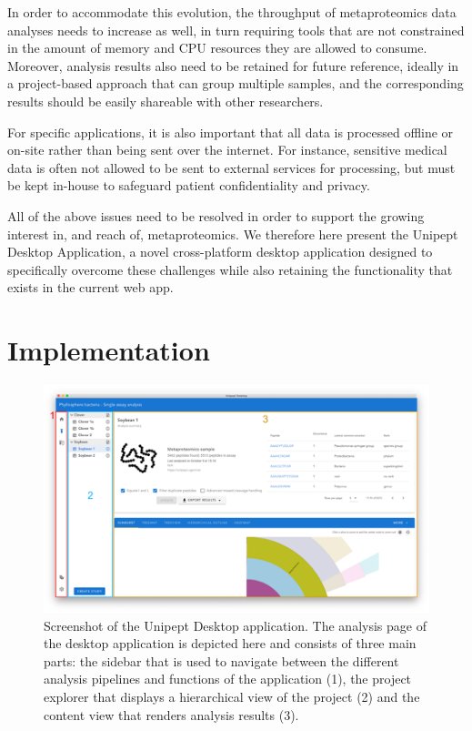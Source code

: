 In order to accommodate this evolution, the throughput of metaproteomics
data analyses needs to increase as well, in turn requiring tools that
are not constrained in the amount of memory and CPU resources they are
allowed to consume. Moreover, analysis results also need to be retained
for future reference, ideally in a project-based approach that can group
multiple samples, and the corresponding results should be easily
shareable with other researchers.

For specific applications, it is also important that all data is
processed offline or on-site rather than being sent over the internet.
For instance, sensitive medical data is often not allowed to be sent to
external services for processing, but must be kept in-house to safeguard
patient confidentiality and privacy.

All of the above issues need to be resolved in order to support the
growing interest in, and reach of, metaproteomics. We therefore here
present the Unipept Desktop Application, a novel cross-platform desktop
application designed to specifically overcome these challenges while
also retaining the functionality that exists in the current web app.

\hypertarget{implementation}{%
\section{Implementation}\label{implementation}}

\begin{figure}
\centering
\includegraphics{resources/figures/chapter2_application_overview_screenshot.png}
\caption{Screenshot of the Unipept Desktop application. The analysis
page of the desktop application is depicted here and consists of three
main parts: the sidebar that is used to navigate between the different
analysis pipelines and functions of the application (1), the project
explorer that displays a hierarchical view of the project (2) and the
content view that renders analysis results
(3).\label{fig:desktop_app_overview_screenshot}}
\end{figure}

